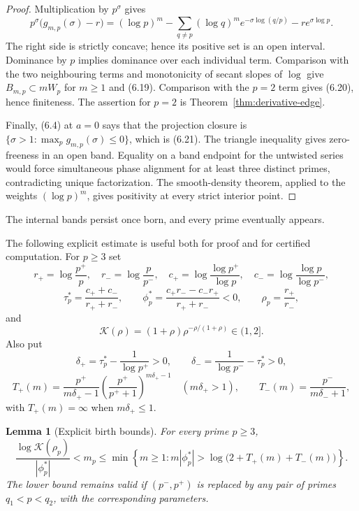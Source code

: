 \documentclass[11pt]{article}
\newtheorem{lemma}[theorem]{Lemma}
\theoremstyle{definition}
\theoremstyle{remark}
\begin{document}
\begin{proof}
Multiplication by $p^\sigma$ gives
\[
 p^\sigma\bigl(g_{m,p}(\sigma)-r\bigr)
 = (\log p)^m-
 \sum_{q\ne p}(\log q)^m e^{-\sigma\log(q/p)}
 -r e^{\sigma\log p}.
\tag{6.22}
\]
The right side is strictly concave; hence its positive set is an open
interval.  Dominance by $p$ implies dominance over each individual term.
Comparison with the two neighbouring terms and monotonicity of secant
slopes of $\log$ give $B_{m,p}\subset mW_p$ for $m\ge1$ and (6.19).
Comparison with the $p=2$ term gives (6.20), hence finiteness.
The assertion for $p=2$ is Theorem~\ref{thm:derivative-edge}.

Finally, (6.4) at $a=0$ says that the projection closure is
$\{\sigma>1:\max_p g_{m,p}(\sigma)\le0\}$, which is (6.21).
The triangle inequality gives zero-freeness in an open band.  Equality
on a band endpoint for the untwisted series would force simultaneous
phase alignment for at least three distinct primes, contradicting unique
factorization.  The smooth-density theorem, applied to the weights
$(\log p)^m$, gives positivity at every strict interior point.
\end{proof}

The internal bands persist once born, and every prime eventually appears.

The following explicit estimate is useful both for proof and for certified
computation.  For $p\ge3$ set
\[
 r_+=\log\frac{p^+}{p},\quad r_-=\log\frac{p}{p^-},\quad
 c_+=\log\frac{\log p^+}{\log p},\quad
 c_-=\log\frac{\log p}{\log p^-},
\]
\[
 \tau_p^*=\frac{c_++c_-}{r_++r_-},\qquad
 \phi_p^*=\frac{c_+r_--c_-r_+}{r_++r_-}<0,
 \qquad \rho_p=\frac{r_+}{r_-},
\]
and
\[
 \mathcal K(\rho)=(1+\rho)\rho^{-\rho/(1+\rho)}\in(1,2].
\]
Also put
\[
 \delta_+=\tau_p^*-\frac1{\log p^+}>0,
 \qquad
 \delta_-=\frac1{\log p^-}-\tau_p^*>0,
\]
\[
 T_+(m)=
 \frac{p^+}{m\delta_+-1}
 \left(\frac{p^+}{p^++1}\right)^{m\delta_+-1}
 \quad(m\delta_+>1),
 \qquad
 T_-(m)=\frac{p^-}{m\delta_-+1},
\]
with $T_+(m)=\infty$ when $m\delta_+\le1$.

\begin{lemma}[Explicit birth bounds]
\label{lem:explicit-birth-bounds}
For every prime $p\ge3$,
\[
 \boxed{
 \frac{\log\mathcal K(\rho_p)}{|\phi_p^*|}<m_p
 \le
 \min\left\{m\ge1:
 m|\phi_p^*|>\log\bigl(2+T_+(m)+T_-(m)\bigr)\right\}.}
\tag{6.22a}
\]
The lower bound remains valid if $(p^-,p^+)$ is replaced by any
pair of primes $q_1<p<q_2$, with the corresponding parameters.
\end{lemma}
\end{document}
